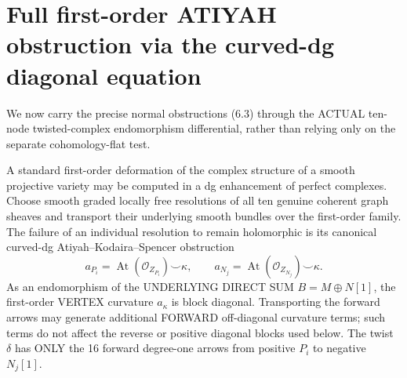 \documentclass[11pt,a4paper]{article}
\begin{document}
\section{Full first-order ATIYAH obstruction via the curved-dg diagonal equation}
We now carry the precise normal
obstructions (6.3) through the
ACTUAL ten-node twisted-complex
endomorphism differential, rather
than relying only on the separate
cohomology-flat test.

A standard first-order deformation
of the complex structure of a
smooth projective variety may be
computed in a dg enhancement of
perfect complexes. Choose smooth
graded locally free resolutions
of all ten genuine coherent
graph sheaves and transport
their underlying smooth bundles
over the first-order family.
The failure of an individual
resolution to remain holomorphic
is its canonical curved-dg
Atiyah--Kodaira--Spencer
obstruction
\[
    a_{P_i}=\operatorname{At}
      (\mathcal O_{Z_{P_i}})\smile\kappa,
 \qquad
    a_{N_j}=\operatorname{At}
      (\mathcal O_{Z_{N_j}})\smile\kappa .
\]
As an endomorphism of the
UNDERLYING DIRECT SUM
\(B=M\oplus N[1]\),
the first-order VERTEX
curvature \(a_\kappa\)
is block diagonal.
Transporting the forward
arrows may generate
additional FORWARD
off-diagonal curvature
terms; such terms
do not affect the
reverse or positive
diagonal blocks
used below.
The twist \(\delta\)
has ONLY the 16
forward degree-one
arrows from positive
\(P_i\) to negative
\(N_j[1]\).
\end{document}
